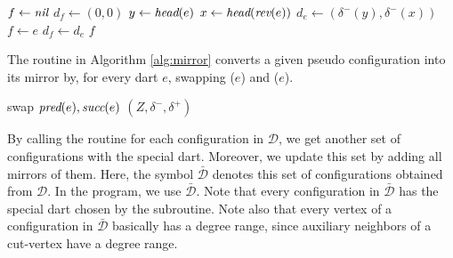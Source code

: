 \documentclass[main.tex]{subfiles}
\begin{document}
\begin{algorithm}
    \caption{\maximumDegreeDartWithLink($(Z, \delta^-, \delta^+)$}
    \label{alg:maximum_dart_degree}
    \begin{algorithmic}[1]
        \State $f \gets \textit{nil}$
        \State $d_f \gets (0, 0)$
            \State $y \gets \textit{head}(e)$
            \State $x \gets \textit{head}(\textit{rev}(e))$
                \Continue
            \EndIf
            \State $d_e \gets (\delta^-(y), \delta^-(x))$
             
                \State $f \gets e$
                \State $d_f \gets d_e$
            \EndIf       
        \EndFor
        \State \Return $f$
    \end{algorithmic}
\end{algorithm}

The \mirror routine in Algorithm \ref{alg:mirror} converts a given pseudo configuration into its mirror by, for every dart $e$, swapping \predecessor($e$) and \successor($e$).

\begin{algorithm}[H]
    \caption{\mirrorWithLink($Z, \delta^-, \delta^+$)}
    \label{alg:mirror}
    \begin{algorithmic}[1]
            \State swap $\textit{pred}(e), \textit{succ}(e)$
        \EndFor
        \State \Return $(Z, \delta^-, \delta^+)$
    \end{algorithmic}
\end{algorithm}

By calling the \extendFromCutVertices routine for each configuration in $\mathcal{D}$, we get another set of configurations with the special dart.
Moreover, we update this set by adding all mirrors of them.
Here, the symbol $\bar{\mathcal{D}}$ denotes this set of configurations obtained from $\mathcal{D}$.
In the program, we use $\bar{\mathcal{D}}$.
Note that every configuration in $\bar{\mathcal{D}}$ has the special dart chosen by the \maximumDartDegree subroutine.
Note also that every vertex of a configuration in $\bar{\mathcal{D}}$ basically has a degree range, since auxiliary neighbors of a cut-vertex have a degree range.
\end{document}
